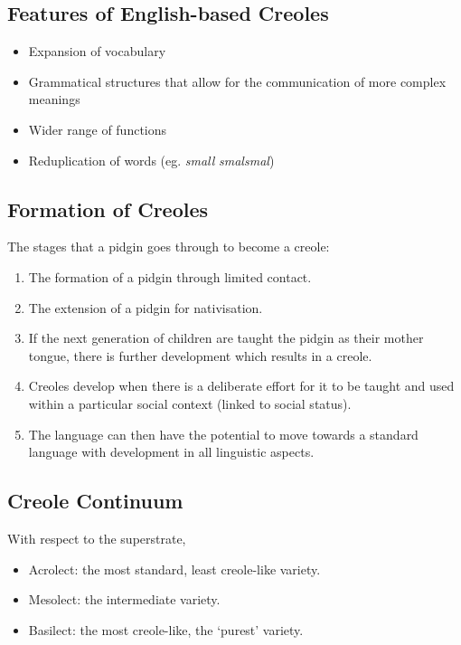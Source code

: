 \documentclass[../main.tex]{subfiles}
\begin{document}
        \subsection{Features of English-based Creoles}
        \begin{itemize}
            \item Expansion of vocabulary
            \item Grammatical structures that allow for the communication of more complex meanings
            \item Wider range of functions
            \item Reduplication of words (eg. \textit{small} \textrightarrow{} \textit{smalsmal})
        \end{itemize}

        \subsection{Formation of Creoles}
        The stages that a pidgin goes through to become a creole:
        \begin{enumerate}
            \item The formation of a pidgin through limited contact.
            \item The extension of a pidgin for nativisation.
            \item If the next generation of children are taught the pidgin as their mother tongue, there is further development which results in a creole.
            \item Creoles develop when there is a deliberate effort for it to be taught and used within a particular social context (linked to social status).
            \item The language can then have the potential to move towards a standard language with development in all linguistic aspects.
        \end{enumerate}
        
        \subsection{Creole Continuum}
        With respect to the superstrate,
        \begin{itemize}
            \item Acrolect: the most standard, least creole-like variety.
            \item Mesolect: the intermediate variety.
            \item Basilect: the most creole-like, the `purest' variety.
        \end{itemize}
\end{document}
